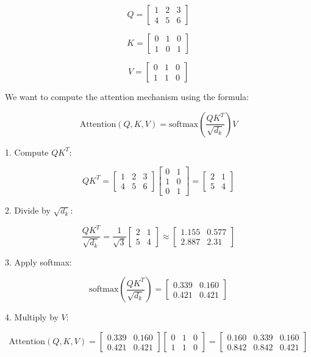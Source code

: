 \[ Q = \begin{bmatrix} 1 & 2 & 3 \\ 4 & 5 & 6 \end{bmatrix} \]

\[ K = \begin{bmatrix} 0 & 1 & 0 \\ 1 & 0 & 1 \end{bmatrix} \]

\[ V = \begin{bmatrix} 0 & 1 & 0 \\ 1 & 1 & 0 \end{bmatrix} \]

We want to compute the attention mechanism using the formula:

\[ \text{Attention}(Q, K, V) = \text{softmax}\left(\frac{QK^T}{\sqrt{d_k}}\right)V \]

1. Compute \( QK^T \):

\[ QK^T = \begin{bmatrix} 1 & 2 & 3 \\ 4 & 5 & 6 \end{bmatrix} \begin{bmatrix} 0 & 1 \\ 1 & 0 \\ 0 & 1 \end{bmatrix} = \begin{bmatrix} 2 & 1 \\ 5 & 4 \end{bmatrix} \]

2. Divide by \( \sqrt{d_k} \):

\[ \frac{QK^T}{\sqrt{d_k}} = \frac{1}{\sqrt{3}} \begin{bmatrix} 2 & 1 \\ 5 & 4 \end{bmatrix} \approx \begin{bmatrix} 1.155 & 0.577 \\ 2.887 & 2.31 \end{bmatrix} \]

3. Apply softmax:

\[ \text{softmax}\left(\frac{QK^T}{\sqrt{d_k}}\right) = \begin{bmatrix} 0.339 & 0.160 \\ 0.421 & 0.421 \end{bmatrix} \]

4. Multiply by \( V \):

\[ \text{Attention}(Q, K, V) = \begin{bmatrix} 0.339 & 0.160 \\ 0.421 & 0.421 \end{bmatrix} \begin{bmatrix} 0 & 1 & 0 \\ 1 & 1 & 0 \end{bmatrix} = \begin{bmatrix} 0.160 & 0.339 & 0.160 \\ 0.842 & 0.842 & 0.421 \end{bmatrix} \]

